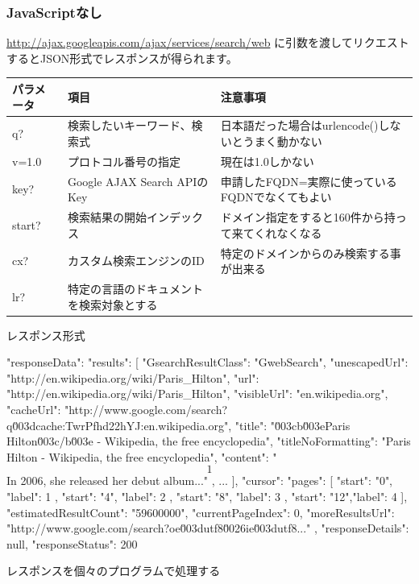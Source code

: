 \documentclass[mingoth,a4paper]{jsarticle}
\begin{document}
\subsubsection{JavaScriptなし}
\url{http://ajax.googleapis.com/ajax/services/search/web}
に引数を渡してリクエストするとJSON形式でレスポンスが得られます。

\begin{table}[h]
\begin{tabular}{|l|l|l|}
\hline
パラメータ & 項目 & 注意事項 \\
\hline
   q? & 検索したいキーワード、検索式 & 日本語だった場合はurlencode()しないとうまく動かない\\
\hline
   v=1.0 & プロトコル番号の指定 & 現在は1.0しかない\\
\hline
   key? & Google AJAX Search APIのKey & 申請したFQDN=実際に使っているFQDNでなくてもよい\\
\hline
   start? & 検索結果の開始インデックス & ドメイン指定をすると160件から持って来てくれなくなる\\
\hline
   cx? & カスタム検索エンジンのID & 特定のドメインからのみ検索する事が出来る\\
\hline
   lr? & 特定の言語のドキュメントを検索対象とする & \\
\hline
\end{tabular}
\end{table}
レスポンス形式
\begin{commandline}
{"responseData": {
 "results": [
  {
   "GsearchResultClass": "GwebSearch",
   "unescapedUrl": "http://en.wikipedia.org/wiki/Paris_Hilton",
   "url": "http://en.wikipedia.org/wiki/Paris_Hilton",
   "visibleUrl": "en.wikipedia.org",
   "cacheUrl": "http://www.google.com/search?q\u003dcache:TwrPfhd22hYJ:en.wikipedia.org",
   "title": "\u003cb\u003eParis Hilton\u003c/b\u003e - Wikipedia, the free encyclopedia",
   "titleNoFormatting": "Paris Hilton - Wikipedia, the free encyclopedia",
   "content": "\[1\] In 2006, she released her debut album..."
  },
  ...
 ],
 "cursor": {
  "pages": [
   { "start": "0", "label": 1 },
   { "start": "4", "label": 2 },
   { "start": "8", "label": 3 },
   { "start": "12","label": 4 }
  ],
  "estimatedResultCount": "59600000",
  "currentPageIndex": 0,
  "moreResultsUrl": "http://www.google.com/search?oe\u003dutf8\u0026ie\u003dutf8..."
 }
}
, "responseDetails": null, "responseStatus": 200}
\end{commandline}
レスポンスを個々のプログラムで処理する
\end{document}
